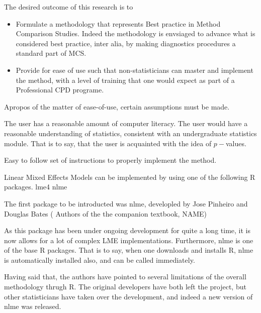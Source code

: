 \documentclass[12pt, a4paper]{report}
\begin{document}






The desired outcome of this research is to

\begin{itemize}
	\item Formulate a methodology that represents Best practice in Method Comparison Studies. Indeed the methodology is envsiaged to advance what is considered best practice, inter alia, by making diagnostics procedures a standard part of MCS. 
	
	\item Provide for ease of use such that non-statisticians can master and implement the method, with a level of training that one would expect 
	as part of a Professional CPD programe.
	
\end{itemize}

Apropos of the matter of ease-of-use, certain assumptions must be made.


The user has a reasonable amount of computer literacy.
The user would have a reasonable understanding of statistics, consistent with an undergraduate statistics module. 
That is to say, that the user is acquainted with the idea of $p-$values.

Easy to follow set of instructions to properly implement the method.


Linear Mixed Effects Models can be implemented by using one of the following R packages.
lme4
nlme

The first package to be introducted was nlme, developled by Jose Pinheiro and Douglas Bates ( Authors of the the companion textbook, NAME)

As this package has been under ongoing development for quite a long time, it is now allows for a lot of complex LME implementations. 
Furthermore, nlme is one of the base R packages.  That is to say, when one downloads and installs R, nlme is automatically installed also, and can be called immediately.

Having said that, the authors have pointed to several limitations of the overall methodology thrugh R.
The original developers have both left the project, but other statisticians have taken over the development, and indeed a new version of nlme was released.
\end{document}
